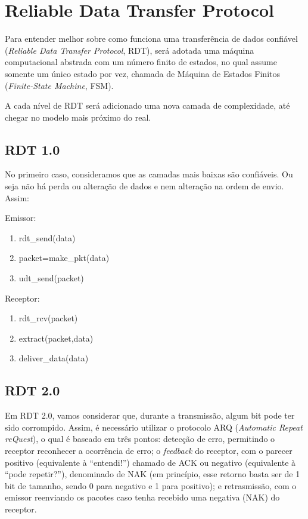 \hypertarget{reliable-data-transfer-protocol}{%
\section {Reliable Data Transfer Protocol} \label{reliable-data-transfer-protocol}}

Para entender melhor sobre como funciona uma transferência de dados
confiável (\emph{Reliable Data Transfer Protocol}, RDT), será adotada
uma máquina computacional abstrada com um número finito de estados, no
qual assume somente um único estado por vez, chamada de Máquina de
Estados Finitos (\emph{Finite-State Machine}, FSM).

A cada nível de RDT será adicionado uma nova camada de complexidade, até
chegar no modelo mais próximo do real.

\hypertarget{rdt-1.0}{%
\subsection{RDT 1.0}\label{rdt-1.0}}

No primeiro caso, consideramos que as camadas mais baixas são
confiáveis. Ou seja não há perda ou alteração de dados e nem alteração
na ordem de envio. Assim:

Emissor:

\begin{enumerate}
\def\labelenumi{\arabic{enumi}.}

\item
  rdt\_send(data)
\item
  packet=make\_pkt(data)
\item
  udt\_send(packet)
\end{enumerate}

Receptor:

\begin{enumerate}
\def\labelenumi{\arabic{enumi}.}
\setcounter{enumi}{3}

\item
  rdt\_rcv(packet)
\item
  extract(packet,data)
\item
  deliver\_data(data)
\end{enumerate}

\hypertarget{rdt-2.0}{%
\subsection{RDT 2.0}\label{rdt-2.0}}

Em RDT 2.0, vamos considerar que, durante a transmissão, algum bit pode
ter sido corrompido. Assim, é necessário utilizar o protocolo ARQ
(\emph{Automatic Repeat reQuest}), o qual é baseado em três pontos:
detecção de erro, permitindo o receptor reconhecer a ocorrência de erro;
o \emph{feedback} do receptor, com o parecer positivo (equivalente à
``entendi!'') chamado de ACK ou negativo (equivalente à ``pode
repetir?''), denominado de NAK (em princípio, esse retorno basta ser de
1 bit de tamanho, sendo 0 para negativo e 1 para positivo); e
retrasmissão, com o emissor reenviando os pacotes caso tenha recebido
uma negativa (NAK) do receptor.

